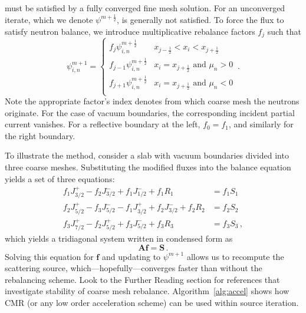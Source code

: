  must be satisfied by a fully converged fine mesh 
solution.  For an unconverged iterate, which we denote $\psi^{m+\frac{1}{2}}$, 
 is generally not satisfied.  To force the flux to 
satisfy neutron balance, we introduce multiplicative rebalance factors $f_j$ 
such that
\begin{equation}
 \psi^{m+1}_{i,n} =
 \begin{cases} f_j \psi^{m+\frac{1}{2}}_{i,n}     &   x_{j-\frac{1}{2}} < x_{i} 
< x_{j+\frac{1}{2}} \\
               f_{j-1} \psi^{m+\frac{1}{2}}_{i,n} &   x_{i} = x_{j+\frac{1}{2}} 
\text{ and } \mu_n > 0 \\
               f_{j+1} \psi^{m+\frac{1}{2}}_{i,n} &   x_{i} = x_{j+\frac{1}{2}} 
\text{ and } \mu_n < 0 \\
 \end{cases} \, .
 \label{eq:cmr_alpha}
\end{equation}
Note the appropriate factor's index denotes from which coarse mesh the neutrons 
originate. For the case of vacuum boundaries, the corresponding incident partial 
current vanishes.  For a reflective boundary at the left, $f_0 = f_1$, and 
similarly for the right boundary.

To illustrate the method, consider a slab with vacuum boundaries divided into 
three coarse meshes.  Substituting the modified fluxes into the balance equation 
yields a set of three equations:
\begin{equation}
\begin{split}
  f_1 J^+_{3/2}  - f_2 J^{-}_{3/2}                   + f_1 J^{-}_{1/2} + f_1 R_1 
&= f_1 S_1 \\
  f_2 J^+_{5/2}  - f_3 J^{-}_{5/2} - f_1 J^{+}_{3/2} + f_2 J^{-}_{3/2} + f_2 R_2 
&= f_2 S_2 \\
  f_3 J^+_{7/2}                    - f_2 J^{+}_{5/2} + f_3 J^{-}_{5/2} + f_3 R_3 
&= f_3 S_3 \, ,
\end{split}
\end{equation}
which yields a tridiagonal system written in condensed form as
\begin{equation}
 \mathbf{A} \mathbf{f} = \mathbf{S} \, .
\end{equation}
Solving this equation for $\mathbf{f}$ and updating to $\psi^{m+1}$ allows us to 
recompute the scattering source, which---hopefully---converges faster than 
without the rebalancing scheme.  Look to the Further Reading section for 
references that investigate stability of coarse mesh rebalance.  
Algorithm~\ref{alg:accel} shows how CMR (or any low order acceleration scheme) 
can be used within source iteration.

